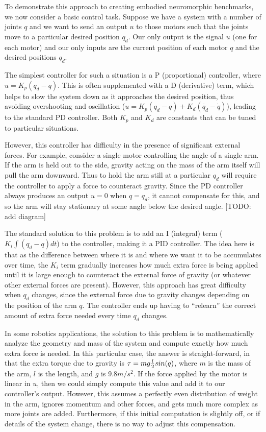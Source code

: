 \documentclass{frontiersSCNS} %
\begin{document}
To demonstrate this approach to creating embodied neuromorphic benchmarks,
we now consider a basic control task.  Suppose we have a system with a number
of joints $q$ and we want to send an output $u$ to those motors such that
the joints move to a particular desired position $q_d$.  Our only output is
the signal $u$ (one for each motor) and our only inputs are the current position
of each motor $q$ and the desired positions $q_d$.

The simplest controller for such a situation is a P (proportional) controller,
where $u=K_p(q_d - q)$.  This is often supplemented with a D (derivative) term,
which helps to slow the system down as it approaches the desired position,
thus avoiding overshooting and oscillation ($u=K_p(q_d - q) + K_d(\dot{q_d} - \dot{q})$),
leading to the standard PD controller.  Both $K_p$ and $K_d$ are constants that can be
tuned to particular situations.

However, this controller has difficulty in the presence of significant external
forces.  For example, consider a single motor controlling the angle of a single
arm.  If the arm is held out to the side, gravity acting on the mass of the
arm itself will pull the arm downward.  Thus to hold the arm still at a
particular $q_d$ will require the controller to apply a force to counteract
gravity.  Since the PD controller always produces an output $u=0$ when $q=q_d$,
it cannot compensate for this, and so the arm will stay stationary at some
angle below the desired angle. [TODO: add diagram]

The standard solution to this problem is to add an I (integral) term ($K_i \int{(q_d-q) dt}$)
to the controller, making it a PID controller.  The idea here is that as the difference between where it is and
where we want it to be accumulates over time, the $K_i$ term gradually increases
how much extra force is being applied until it is large enough to counteract
the external force of gravity (or whatever other external forces are present).
However, this approach has great difficulty when $q_d$ changes, since the
external force due to gravity changes depending on the position of the arm $q$.
The controller ends up having to ``relearn'' the
correct amount of extra force needed every time $q_d$ changes.

In some robotics applications, the solution to this problem is to mathematically
analyze the geometry and mass of the system and compute exactly how much extra
force is needed.  In this particular case, the answer is straight-forward,
in that the extra torque due to gravity is $\tau=mg {l \over 2} sin(q)$, where
$m$ is the mass of the arm, $l$ is the length, and $g$ is $9.8m/s^2$.  If the
force applied by the motor is linear in $u$, then we could simply compute this
value and add it to our controller's output.  However, this assumes a perfectly
even distribution of weight in the arm, ignores momentum and other forces, and 
gets much more complex as more joints are added.  Furthermore, if this
initial computation is slightly off, or if details of the system change,
there is no way to adjust this compensation.
\end{document}
